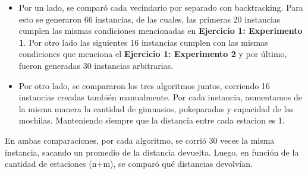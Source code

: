             \begin{itemize}
                \item Por un lado, se comparó cada vecindario por separado con backtracking. Para esto se generaron 66 instancias, de las cuales, las primeras 20 instancias cumplen las mismas condiciones mencionadas en \textbf{Ejercicio 1: Experimento 1}. Por otro lado las siguientes 16 instancias  cumplen con las mismas condiciones que menciona el \textbf{Ejercicio 1: Experimento 2} y por último, fueron generadas 30 instancias arbitrarias.
 
                \item Por otro lado, se compararon los tres algoritmos juntos, corriendo 16 instancias creadas también manualmente. Por cada instancia, aumentamos de la misma manera la cantidad de gimnasios, pokeparadas y capacidad de las mochilas. Manteniendo siempre que la distancia entre cada estacion es 1.
            \end{itemize}

             En ambas comparaciones, por cada algoritmo, se corrió 30 veces la misma instancia, sacando un promedio de la distancia devuelta. Luego, en función de la cantidad de estaciones (n+m), se comparó qué distancias devolvían.

\blindtext

